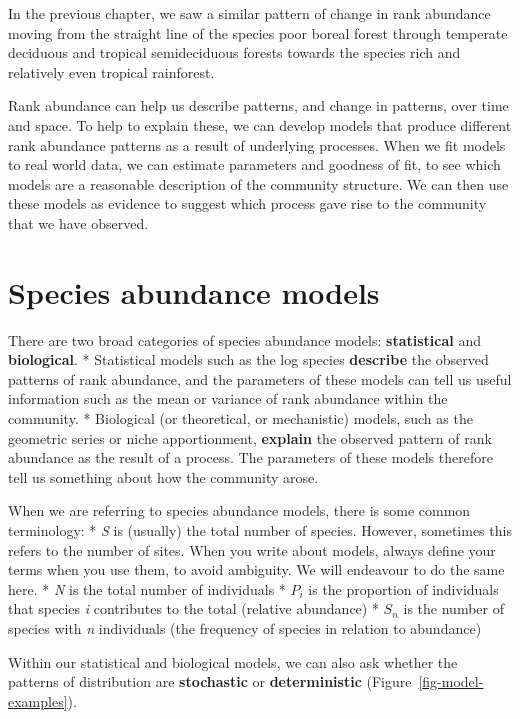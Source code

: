 \documentclass[
  letterpaper,
  DIV=11,
  numbers=noendperiod]{scrreprt}
\begin{document}
In the previous chapter, we saw a similar pattern of change in rank
abundance moving from the straight line of the species poor boreal
forest through temperate deciduous and tropical semideciduous forests
towards the species rich and relatively even tropical rainforest.

Rank abundance can help us describe patterns, and change in patterns,
over time and space. To help to explain these, we can develop models
that produce different rank abundance patterns as a result of underlying
processes. When we fit models to real world data, we can estimate
parameters and goodness of fit, to see which models are a reasonable
description of the community structure. We can then use these models as
evidence to suggest which process gave rise to the community that we
have observed.

\section{Species abundance models}\label{species-abundance-models}

There are two broad categories of species abundance models:
\textbf{statistical} and \textbf{biological}. * Statistical models such
as the log species \textbf{describe} the observed patterns of rank
abundance, and the parameters of these models can tell us useful
information such as the mean or variance of rank abundance within the
community. * Biological (or theoretical, or mechanistic) models, such as
the geometric series or niche apportionment, \textbf{explain} the
observed pattern of rank abundance as the result of a process. The
parameters of these models therefore tell us something about how the
community arose.

When we are referring to species abundance models, there is some common
terminology: * \emph{S} is (usually) the total number of species.
However, sometimes this refers to the number of sites. When you write
about models, always define your terms when you use them, to avoid
ambiguity. We will endeavour to do the same here. * \emph{N} is the
total number of individuals * \(P_i\) is the proportion of individuals
that species \emph{i} contributes to the total (relative abundance) *
\(S_n\) is the number of species with \emph{n} individuals (the
frequency of species in relation to abundance)

Within our statistical and biological models, we can also ask whether
the patterns of distribution are \textbf{stochastic} or
\textbf{deterministic} (Figure~\ref{fig-model-examples}).
\end{document}
